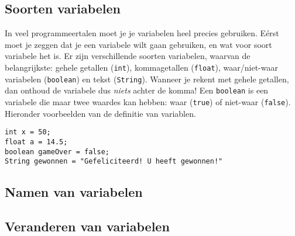 \documentclass[a4paper,11pt]{report}
\begin{document}
\subsection{Soorten variabelen}

In veel programmeertalen moet je je variabelen heel precies gebruiken.
Eérst moet je zeggen dat je een variabele wilt gaan gebruiken, en wat voor
soort variabele het is.  Er zijn verschillende soorten variabelen, waarvan
de belangrijkste: gehele getallen (\verb|int|), kommagetallen
(\verb|float|), waar/niet-waar variabelen (\verb|boolean|) en tekst
(\verb|String|).  Wanneer je rekent met gehele getallen, dan onthoud de
variabele dus \emph{niets} achter de komma!  Een \verb|boolean| is een
variabele die maar twee waardes kan hebben: waar (\verb|true|) of
niet-waar (\verb|false|).  Hieronder voorbeelden van de definitie van
variablen.
\begin{verbatim}
int x = 50;
float a = 14.5;
boolean gameOver = false;
String gewonnen = "Gefeliciteerd! U heeft gewonnen!"
\end{verbatim}


\subsection{Namen van variabelen}


\subsection{Veranderen van variabelen}
\end{document}

